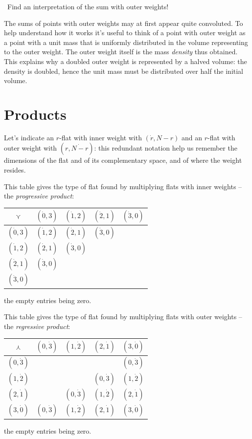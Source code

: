 \documentclass[\ifafour a4paper,12pt,\else a5paper,10pt,\fi%
onecolumn,oneside,article,%
british%
]{memoir}
\theoremstyle{remark}
\theoremstyle{innote}
\renewcommand*{\|}{\nonscript\,\vert\nonscript\;\mathopen{}}
\newcommand*{\puzzle}{{\fontencoding{U}\fontfamily{fontawesometwo}\selectfont\symbol{225}}}
\newcommand{\mynote}[1]{ {\color{notecolour}\puzzle\ #1}}
\newcommand*{\ve}{\curlyvee}
\newcommand*{\we}{\curlywedge}
\newcommand*{\+}{\boxplus}
\newcommand*{\ywp}{\dot{0}}
\newcommand*{\ywl}{\dot{1}}
\newcommand*{\ywa}{\dot{2}}
\newcommand*{\ywv}{\dot{3}}
\begin{document}
\mynote{Find an interpretation of the sum with outer weights!}

The sums of points with outer weights may at first appear quite convoluted.
To help understand how it works it's useful to think of a point with outer
weight as a point with a unit mass that is uniformly distributed in the
volume representing to the outer weight. The outer weight itself is the
mass \emph{density} thus obtained. This explains why a doubled outer weight
is represented by a halved volume: the density is doubled, hence the unit
mass must be distributed over half the initial volume.

\section{Products}
\label{sec:products}

Let's indicate an $r$-flat with inner weight with $(\dot{r}, N-r)$ and
an $r$-flat with outer weight with $(r, \dot{N-r})$: this redundant
notation help us remember the dimensions of the flat and of its
complementary space, and of where the weight resides.

This table gives the type of flat found by multiplying flats with inner
weights -- the \emph{progressive product}:

{\centering
  \begin{tabular}{c|cccc}
    $\ve$& $(\ywp,3)$&$(\ywl,2)$&$(\ywa,1)$&$(\ywv,0)$ \\
    \midrule
    $(\ywp,3)$&$(\ywl,2)$&$(\ywa,1)$&$(\ywv,0)$& \\
    $(\ywl,2)$&$(\ywa,1)$&$(\ywv,0)$&& \\
    $(\ywa,1)$&$(\ywv,0)$&&& \\
    $(\ywv,0)$&&&& 
  \end{tabular}

}
the empty entries being zero.

This table gives the type of flat found by multiplying flats with outer
weights -- the \emph{regressive product}:

{\centering
  \begin{tabular}{c|cccc}
    $\we$& $(0,\ywv)$&$(1,\ywa)$&$(2,\ywl)$&$(3,\ywp)$ \\
    \midrule
    $(0,\ywv)$&&&&$(0,\ywv)$ \\
    $(1,\ywa)$&&&$(0,\ywv)$&$(1,\ywa)$ \\
    $(2,\ywl)$&&$(0,\ywv)$&$(1,\ywa)$&$(2,\ywl)$ \\
    $(3,\ywp)$&$(0,\ywv)$&$(1,\ywa)$&$(2,\ywl)$&$(3,\ywp)$ \\
  \end{tabular}

}
the empty entries being zero.
        
\end{document}
